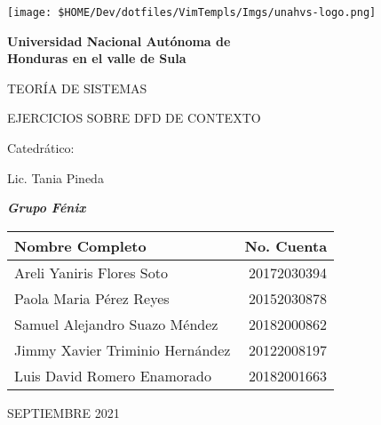 \documentclass[12pt]{article}
\begin{document}
\begin{titlepage}

  \begin{center}
    {\texttt{[image: \$HOME/Dev/dotfiles/VimTempls/Imgs/unahvs-logo.png]}\par}
  
    {\bfseries\Huge Universidad Nacional Autónoma de\\
                     Honduras en el valle de Sula \par}
  
    \vspace{1cm}
  
    {\scshape\huge TEORÍA DE SISTEMAS\par}
  
    \vspace{1cm}
  
    {\scshape\Large EJERCICIOS SOBRE DFD DE CONTEXTO}
  
    \vfill 
    {\large Catedrático:\par} %
    {\large Lic. Tania Pineda\par} %
  
    \vfill

      \textbf{\textit{ Grupo Fénix }}
    
      \begin{tabular}{lr} \toprule
          Nombre Completo & No. Cuenta\\ \midrule
          Areli Yaniris Flores Soto & 20172030394 \\
          Paola Maria Pérez Reyes & 20152030878 \\
          Samuel Alejandro Suazo Méndez & 20182000862 \\
          Jimmy Xavier Triminio Hernández & 20122008197 \\
          Luis David Romero Enamorado & 20182001663 \\ \bottomrule
      \end{tabular} 

    \vfill
    {\large SEPTIEMBRE 2021\par} %

  \end{center}

\end{titlepage}

\newpage
\tableofcontents
\end{document}
